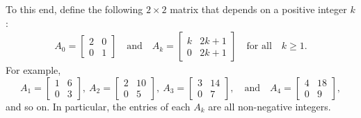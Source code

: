 To this end, define the following $2 \times 2$ matrix that depends on a positive integer $k$:
\begin{align}\label{eq:Ak_matrices}
A_0 = \begin{bmatrix}
2 & 0 \\ 0 & 1
\end{bmatrix} \quad \text{and} \quad A_k = \begin{bmatrix}
k & 2k+1 \\ 0 & 2k+1
\end{bmatrix} \quad \text{for all} \quad k \geq 1.
\end{align}
For example,
\[
A_1 = \begin{bmatrix}
1 & 6 \\ 0 & 3
\end{bmatrix}, \ A_2 = \begin{bmatrix}
2 & 10 \\ 0 & 5
\end{bmatrix}, \ A_3 = \begin{bmatrix}
3 & 14 \\ 0 & 7
\end{bmatrix}, \quad \text{and} \quad A_4 = \begin{bmatrix}
4 & 18 \\ 0 & 9
\end{bmatrix},
\]
and so on. In particular, the entries of each $A_k$ are all non-negative integers.


